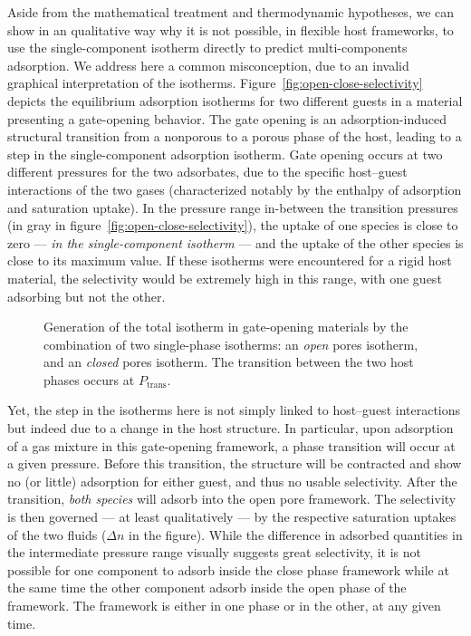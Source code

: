 \documentclass[thesis]{subfiles}
\begin{document}
Aside from the mathematical treatment and thermodynamic hypotheses, we can show
in an qualitative way why it is not possible, in flexible host frameworks, to
use the single-component isotherm directly to predict multi-components
adsorption. We address here a common misconception, due to an invalid graphical
interpretation of the isotherms. Figure~\ref{fig:open-close-selectivity} depicts
the equilibrium adsorption isotherms for two different guests in a material
presenting a gate-opening behavior. The gate opening is an adsorption-induced
structural transition from a nonporous to a porous phase of the host, leading to
a step in the single-component adsorption isotherm. Gate opening occurs at two
different pressures for the two adsorbates, due to the specific host--guest
interactions of the two gases (characterized notably by the enthalpy of
adsorption and saturation uptake). In the pressure range in-between the
transition pressures (in gray in figure~\ref{fig:open-close-selectivity}), the
uptake of one species is close to zero --- \emph{in the single-component
isotherm} --- and the uptake of the other species is close to its maximum value.
If these isotherms were encountered for a rigid host material, the selectivity
would be extremely high in this range, with one guest adsorbing but not the
other.

\begin{figure}[htp]
    \centering
    
    \caption{Generation of the total isotherm in gate-opening materials by the
    combination of two single-phase isotherms: an \emph{open} pores isotherm,
    and an \emph{closed} pores isotherm. The transition between the two host
    phases occurs at $P_\text{trans}$.}
    \label{fig:open-close-isotherms}
\end{figure}

Yet, the step in the isotherms here is not simply linked to host--guest
interactions but indeed due to a change in the host structure. In particular,
upon adsorption of a gas mixture in this gate-opening framework, a phase
transition will occur at a given pressure. Before this transition, the structure
will be contracted and show no (or little) adsorption for either guest, and thus
no usable selectivity. After the transition, \emph{both species} will adsorb
into the open pore framework. The selectivity is then governed --- at least
qualitatively --- by the respective saturation uptakes of the two fluids
($\Delta n$ in the figure). While the difference in adsorbed quantities in the
intermediate pressure range visually suggests great selectivity, it is not
possible for one component to adsorb inside the close phase framework while at
the same time the other component adsorb inside the open phase of the framework.
The framework is either in one phase or in the other, at any given time.
\end{document}
